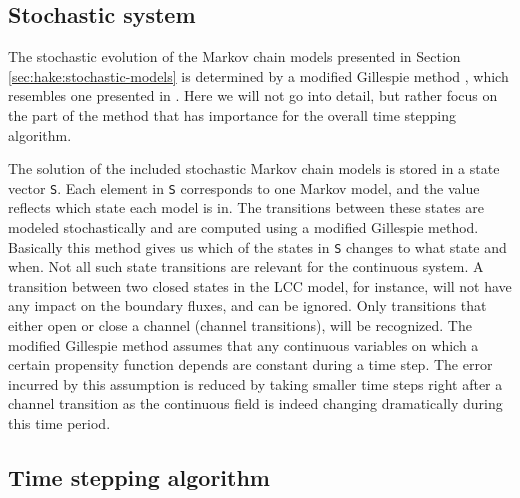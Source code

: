 \subsection{Stochastic system}

\label{sec:hake:stochastic-system}
 
 The stochastic evolution of the
Markov chain models presented in Section
\ref{sec:hake:stochastic-models} is determined by a modified Gillespie
method \citep{Gillespie1977}, which resembles one presented in
\citet{RudigerShuaiHuisingaEtAl2007}. Here we will not go into detail,
but rather focus on the part of the method that has importance for the
overall time stepping algorithm.

The solution of the included stochastic Markov chain models is stored
in a state vector \texttt{S}. Each element in \texttt{S} corresponds
to one Markov model, and the value reflects which state each model is
in. The transitions between these states are modeled stochastically
and are computed using a modified Gillespie method. Basically this
method gives us which of the states in \texttt{S} changes to what
state and when. Not all such state transitions are relevant for the
continuous system. A transition between two closed states in the LCC
model, for instance, will not have any impact on the boundary fluxes,
and can be ignored. Only transitions that either open or close a
channel (channel transitions), will be recognized. The modified
Gillespie method assumes that any continuous variables on which a
certain propensity function depends are constant during a time
step. The error incurred by this assumption is reduced by taking
smaller time steps right after a channel transition as the continuous
field is indeed changing dramatically during this time period.

\subsection{Time stepping algorithm}
\label{sec:hake:event-driven-simulator}

